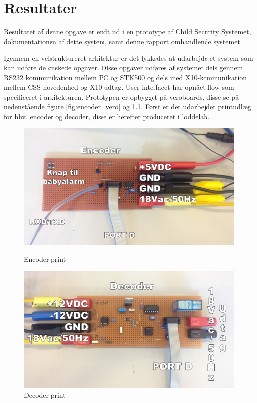 \chapter{Resultater}
Resultatet af denne opgave er endt ud i en prototype af Child Security Systemet, dokumentationen af dette system, samt denne rapport omhandlende systemet.  

Igennem en velstruktureret arkitektur er det lykkedes at udarbejde et system som kan udføre de ønskede opgaver. Disse opgaver udføres af systemet dels gennem RS232 kommunikation mellem PC og STK500 og dels med X10-kommunikation mellem CSS-hovedenhed og X10-udtag. User-interfacet har opnået flow som specificeret i arkitekturen. 
Prototypen er opbygget på veroboards, disse se på nedenstående figure \ref{fig:encoder_vero} og \ref{fig:decoder_vero}. Først er det udarbejdet printudlæg for hhv. encoder og decoder, disse er herefter produceret i loddelab. 

\begin{figure}[htb]
  \begin{minipage}{0.5\textwidth}
    \centering
      \includegraphics[width=\textwidth]{billeder/encoderveroboard}
      \caption{Encoder print}
    \label{fig:encoder_vero}
  \end{minipage}
  \hspace{0.1\textwidth}
  \begin{minipage}{0.5\textwidth}
    \centering
      \includegraphics[width=\textwidth]{billeder/decoderveroboard}
      \caption{Decoder print}
    \label{fig:decoder_vero}
  \end{minipage}
\end{figure}

